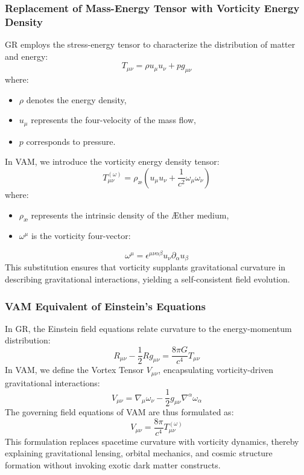 \subsubsection*{Replacement of Mass-Energy Tensor with Vorticity Energy Density}
GR employs the stress-energy tensor to characterize the distribution of matter and energy:
\begin{equation}
    T_{\mu\nu} = \rho u_\mu u_\nu + p g_{\mu\nu}
\end{equation}
where:
\begin{itemize}
    \item $\rho$ denotes the energy density,
    \item $u_\mu$ represents the four-velocity of the mass flow,
    \item $p$ corresponds to pressure.
\end{itemize}
In VAM, we introduce the vorticity energy density tensor:
\begin{equation}
    T^{(\omega)}_{\mu\nu} = \rho_{\text{\ae}} \left( u_\mu u_\nu + \frac{1}{c^2} \omega_\mu \omega_\nu \right)
\end{equation}
where:
\begin{itemize}
    \item $\rho_{\text{\ae}}$ represents the intrinsic density of the \AE ther medium,
    \item $\omega^\mu$ is the vorticity four-vector:
\end{itemize}
\begin{equation}
    \omega^\mu = \epsilon^{\mu\nu\alpha\beta} u_\nu \partial_\alpha u_\beta
\end{equation}
This substitution ensures that vorticity supplants gravitational curvature in describing gravitational interactions, yielding a self-consistent field evolution.

\subsubsection*{VAM Equivalent of Einstein’s Equations}
In GR, the Einstein field equations relate curvature to the energy-momentum distribution:
\begin{equation}
    R_{\mu\nu} - \frac{1}{2} R g_{\mu\nu} = \frac{8\pi G}{c^4} T_{\mu\nu}
\end{equation}
In VAM, we define the Vortex Tensor $V_{\mu\nu}$, encapsulating vorticity-driven gravitational interactions:
\begin{equation}
    V_{\mu\nu} = \nabla_\mu \omega_\nu - \frac{1}{2} g_{\mu\nu} \nabla^\alpha \omega_\alpha
\end{equation}
The governing field equations of VAM are thus formulated as:
\begin{equation}
    V_{\mu\nu} = \frac{8\pi}{c^4} T^{(\omega)}_{\mu\nu}
\end{equation}
This formulation replaces spacetime curvature with vorticity dynamics, thereby explaining gravitational lensing, orbital mechanics, and cosmic structure formation without invoking exotic dark matter constructs.

